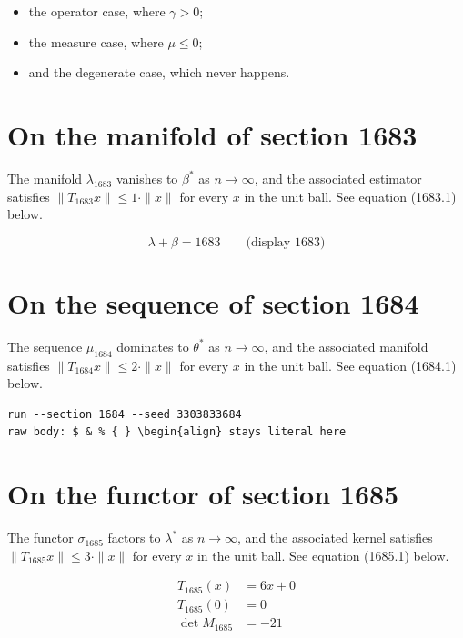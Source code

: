 \documentclass{article}
\begin{document}
\begin{itemize}
  \item the operator case, where $\gamma > 0$;
  \item the measure case, where $\mu \leq 0$;
  \item and the degenerate case, which never happens.
\end{itemize}

\section{On the manifold of section 1683}
The manifold $\lambda_{1683}$ vanishes to $\beta^{*}$ as $n \to \infty$,
and the associated estimator satisfies $\|T_{1683} x\| \leq 1 \cdot \|x\|$
for every $x$ in the unit ball. See equation (1683.1) below.

$$
\lambda + \beta = 1683 \qquad \text{(display 1683)}
$$

\section{On the sequence of section 1684}
The sequence $\mu_{1684}$ dominates to $\theta^{*}$ as $n \to \infty$,
and the associated manifold satisfies $\|T_{1684} x\| \leq 2 \cdot \|x\|$
for every $x$ in the unit ball. See equation (1684.1) below.

\begin{verbatim}
run --section 1684 --seed 3303833684
raw body: $ & % { } \begin{align} stays literal here
\end{verbatim}

\section{On the functor of section 1685}
The functor $\sigma_{1685}$ factors to $\lambda^{*}$ as $n \to \infty$,
and the associated kernel satisfies $\|T_{1685} x\| \leq 3 \cdot \|x\|$
for every $x$ in the unit ball. See equation (1685.1) below.

\begin{align}
T_{1685}(x) &= 6 x + 0 \\
T_{1685}(0) &= 0 \\
\det M_{1685} &= -21
\end{align}
\end{document}
